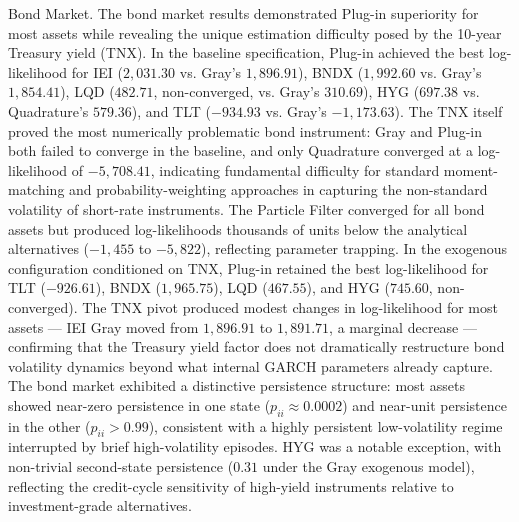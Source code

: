 \documentclass[12pt, a4paper]{article}
\begin{document}
Bond Market.
The bond market results demonstrated Plug-in superiority for most assets while revealing the unique estimation difficulty posed by the 10-year Treasury yield (TNX). In the baseline specification, Plug-in achieved the best log-likelihood for IEI ($2{,}031.30$ vs. Gray's $1{,}896.91$), BNDX ($1{,}992.60$ vs. Gray's $1{,}854.41$), LQD ($482.71$, non-converged, vs. Gray's $310.69$), HYG ($697.38$ vs. Quadrature's $579.36$), and TLT ($-934.93$ vs. Gray's $-1{,}173.63$). The TNX itself proved the most numerically problematic bond instrument: Gray and Plug-in both failed to converge in the baseline, and only Quadrature converged at a log-likelihood of $-5{,}708.41$, indicating fundamental difficulty for standard moment-matching and probability-weighting approaches in capturing the non-standard volatility of short-rate instruments. The Particle Filter converged for all bond assets but produced log-likelihoods thousands of units below the analytical alternatives ($-1{,}455$ to $-5{,}822$), reflecting parameter trapping. In the exogenous configuration conditioned on TNX, Plug-in retained the best log-likelihood for TLT ($-926.61$), BNDX ($1{,}965.75$), LQD ($467.55$), and HYG ($745.60$, non-converged). The TNX pivot produced modest changes in log-likelihood for most assets — IEI Gray moved from $1{,}896.91$ to $1{,}891.71$, a marginal decrease — confirming that the Treasury yield factor does not dramatically restructure bond volatility dynamics beyond what internal GARCH parameters already capture. The bond market exhibited a distinctive persistence structure: most assets showed near-zero persistence in one state ($p_{ii} \approx 0.0002$) and near-unit persistence in the other ($p_{ii} > 0.99$), consistent with a highly persistent low-volatility regime interrupted by brief high-volatility episodes. HYG was a notable exception, with non-trivial second-state persistence ($0.31$ under the Gray exogenous model), reflecting the credit-cycle sensitivity of high-yield instruments relative to investment-grade alternatives.
\end{document}
